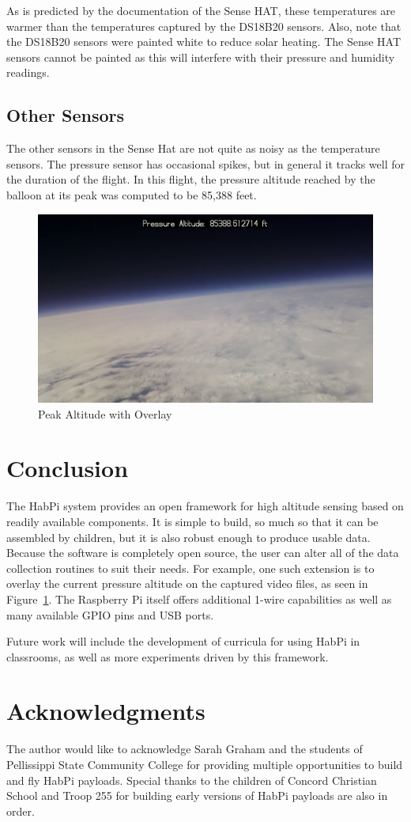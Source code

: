 \documentclass[journal]{new-aiaa}
\begin{document}
As is predicted by the documentation of the Sense HAT, these
temperatures are warmer than the temperatures captured by the DS18B20
sensors.  Also, note that the DS18B20 sensors were painted white to
reduce solar heating.  The Sense HAT sensors cannot be painted as this
will interfere with their pressure and humidity readings.

\subsection{Other Sensors}
The other sensors in the Sense Hat are not quite as noisy as the
temperature sensors.  The pressure sensor has occasional spikes, but
in general it tracks well for the duration of the flight.  In this
flight, the pressure altitude reached by the balloon at its peak was
computed to be 85,388 feet.  

\begin{figure}
    \centering
    \includegraphics[width=0.75\linewidth]{images/peak-altitude}
    \caption{Peak Altitude with Overlay}
    \label{fig:peak}
\end{figure}

\section{Conclusion}
The HabPi system provides an open framework for high altitude sensing
based on readily available components.  It is simple to build, so much
so that it can be assembled by children, but it is also robust enough
to produce usable data.  Because the software is completely open
source, the user can alter all of the data collection routines to
suit their needs.  For example, one such extension is to overlay the
current pressure altitude on the captured video files, as seen in
Figure~\ref{fig:peak}.  The Raspberry Pi itself offers additional
1-wire capabilities as well as many available GPIO pins and USB ports.  

Future work will include the development of curricula for using HabPi
in classrooms, as well as more experiments driven by this framework.

\section{Acknowledgments}
The author would like to acknowledge Sarah Graham and the students of
Pellissippi State Community College for providing multiple
opportunities to build and fly HabPi payloads.  Special thanks to the
children of Concord Christian School and Troop 255 for building early
versions of HabPi payloads are also in order.


\end{document}
